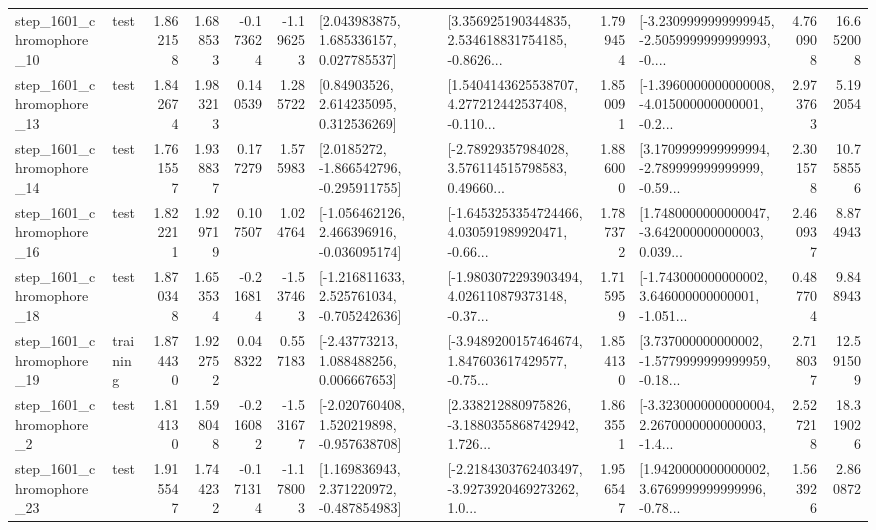 \begin{tabular}{llrrrrllrlrr}
 step\_1601\_chromophore\_10 &      test &      1.862158 &    1.688533 &     -0.173624 & -1.196253 &     [2.043983875, 1.685336157, 0.027785537] &  [3.356925190344835, 2.534618831754185, -0.8626... &       1.799454 &  [-3.2309999999999945, -2.5059999999999993, -0.... &            4.760908 &         16.652008 \\
 step\_1601\_chromophore\_13 &      test &      1.842674 &    1.983213 &      0.140539 &  1.285722 &      [0.84903526, 2.614235095, 0.312536269] &  [1.5404143625538707, 4.277212442537408, -0.110... &       1.850091 &  [-1.3960000000000008, -4.015000000000001, -0.2... &            2.973763 &          5.192054 \\
 step\_1601\_chromophore\_14 &      test &      1.761557 &    1.938837 &      0.177279 &  1.575983 &     [2.0185272, -1.866542796, -0.295911755] &  [-2.78929357984028, 3.576114515798583, 0.49660... &       1.886000 &  [3.1709999999999994, -2.789999999999999, -0.59... &            2.301578 &         10.758556 \\
 step\_1601\_chromophore\_16 &      test &      1.822211 &    1.929719 &      0.107507 &  1.024764 &   [-1.056462126, 2.466396916, -0.036095174] &  [-1.6453253354724466, 4.030591989920471, -0.66... &       1.787372 &  [1.7480000000000047, -3.642000000000003, 0.039... &            2.460937 &          8.874943 \\
 step\_1601\_chromophore\_18 &      test &      1.870348 &    1.653534 &     -0.216814 & -1.537463 &   [-1.216811633, 2.525761034, -0.705242636] &  [-1.9803072293903494, 4.026110879373148, -0.37... &       1.715959 &  [-1.743000000000002, 3.646000000000001, -1.051... &            0.487704 &          9.848943 \\
 step\_1601\_chromophore\_19 &  training &      1.874430 &    1.922752 &      0.048322 &  0.557183 &     [-2.43773213, 1.088488256, 0.006667653] &  [-3.9489200157464674, 1.847603617429577, -0.75... &       1.854130 &  [3.737000000000002, -1.5779999999999959, -0.18... &            2.718037 &         12.591509 \\
  step\_1601\_chromophore\_2 &      test &      1.814130 &    1.598048 &     -0.216082 & -1.531677 &   [-2.020760408, 1.520219898, -0.957638708] &  [2.338212880975826, -3.1880355868742942, 1.726... &       1.863551 &  [-3.3230000000000004, 2.2670000000000003, -1.4... &            2.527218 &         18.319026 \\
 step\_1601\_chromophore\_23 &      test &      1.915547 &    1.744232 &     -0.171314 & -1.178003 &    [1.169836943, 2.371220972, -0.487854983] &  [-2.2184303762403497, -3.9273920469273262, 1.0... &       1.956547 &  [1.9420000000000002, 3.6769999999999996, -0.78... &            1.563926 &          2.860872 \\

\end{tabular}
